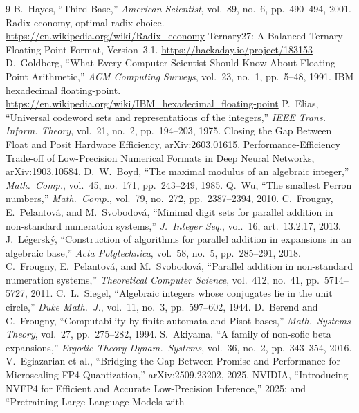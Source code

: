 \documentclass[11pt]{article}
\theoremstyle{definition}
\begin{document}
\begin{thebibliography}{9}
 B.~Hayes, ``Third Base,'' \emph{American Scientist}, vol.~89, no.~6, pp.~490--494, 2001.
 Radix economy, optimal radix choice. \url{https://en.wikipedia.org/wiki/Radix_economy}
 Ternary27: A Balanced Ternary Floating Point Format, Version~3.1. \url{https://hackaday.io/project/183153}
 D.~Goldberg, ``What Every Computer Scientist Should Know About Floating-Point Arithmetic,'' \emph{ACM Computing Surveys}, vol.~23, no.~1, pp.~5--48, 1991.
 IBM hexadecimal floating-point. \url{https://en.wikipedia.org/wiki/IBM_hexadecimal_floating-point}
 P.~Elias, ``Universal codeword sets and representations of the integers,'' \emph{IEEE Trans. Inform. Theory}, vol.~21, no.~2, pp.~194--203, 1975.
 Closing the Gap Between Float and Posit Hardware Efficiency, arXiv:2603.01615.
 Performance-Efficiency Trade-off of Low-Precision Numerical Formats in Deep Neural Networks, arXiv:1903.10584.
 D.~W.~Boyd, ``The maximal modulus of an algebraic integer,''
\emph{Math.\ Comp.}, vol.~45, no.~171, pp.~243--249, 1985.
 Q.~Wu, ``The smallest Perron numbers,'' \emph{Math.\ Comp.},
vol.~79, no.~272, pp.~2387--2394, 2010.
 C.~Frougny, E.~Pelantov\'a, and M.~Svobodov\'a,
``Minimal digit sets for parallel addition in non-standard numeration systems,''
\emph{J.\ Integer Seq.}, vol.~16, art.~13.2.17, 2013.
 J.~L\'egersk\'y, ``Construction of algorithms for
parallel addition in expansions in an algebraic base,'' \emph{Acta
Polytechnica}, vol.~58, no.~5, pp.~285--291, 2018.
 C.~Frougny, E.~Pelantov\'a, and M.~Svobodov\'a,
``Parallel addition in non-standard numeration systems,'' \emph{Theoretical
Computer Science}, vol.~412, no.~41, pp.~5714--5727, 2011.
 C.~L.~Siegel, ``Algebraic integers whose conjugates lie in
the unit circle,'' \emph{Duke Math.\ J.}, vol.~11, no.~3, pp.~597--602, 1944.
 D.~Berend and C.~Frougny, ``Computability by finite automata
and Pisot bases,'' \emph{Math.\ Systems Theory}, vol.~27, pp.~275--282, 1994.
 S.~Akiyama, ``A family of non-sofic beta expansions,''
\emph{Ergodic Theory Dynam.\ Systems}, vol.~36, no.~2, pp.~343--354, 2016.
 V.~Egiazarian et al., ``Bridging the Gap Between Promise and
Performance for Microscaling FP4 Quantization,'' arXiv:2509.23202, 2025.
 NVIDIA, ``Introducing NVFP4 for Efficient and Accurate
Low-Precision Inference,'' 2025; and ``Pretraining Large Language Models with

\end{thebibliography}
\end{document}
